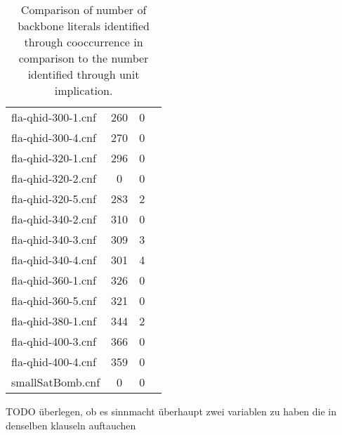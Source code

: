 \begin{wraptable}{L}{7cm}
\begin{tabular}{l| c c c }
fla-qhid-300-1.cnf & 260 & 0 \\
fla-qhid-300-4.cnf & 270 & 0 \\
fla-qhid-320-1.cnf & 296 & 0 \\
\fi
fla-qhid-320-2.cnf & 0 & 0 \\
fla-qhid-320-5.cnf & 283 & 2 \\
fla-qhid-340-2.cnf & 310 & 0 \\
fla-qhid-340-3.cnf & 309 & 3 \\
fla-qhid-340-4.cnf & 301 & 4 \\
fla-qhid-360-1.cnf & 326 & 0 \\
fla-qhid-360-5.cnf & 321 & 0 \\
fla-qhid-380-1.cnf & 344 & 2 \\
fla-qhid-400-3.cnf & 366 & 0 \\
fla-qhid-400-4.cnf & 359 & 0 \\
smallSatBomb.cnf & 0 & 0\\
\end{tabular}
\caption{Comparison of number of backbone literals identified through cooccurrence in comparison to the number identified through unit implication.}
\end{wraptable}


TODO überlegen, ob es sinnmacht überhaupt zwei variablen zu haben die in denselben klauseln auftauchen
